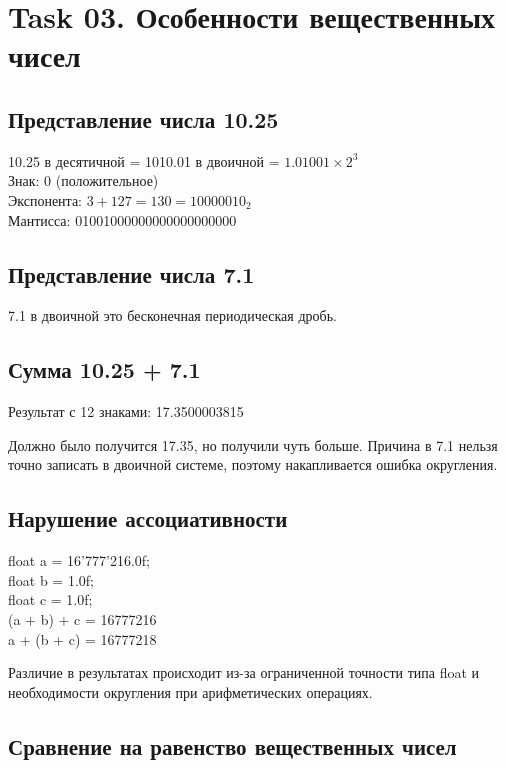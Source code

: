 \documentclass[12pt,a4paper]{article}
\begin{document}
    \section*{Task 03. Особенности вещественных чисел}

    \subsection*{Представление числа 10.25}

    10.25 в десятичной = 1010.01 в двоичной = $1.01001 \times 2^3$\\
    Знак: 0 (положительное)\\
    Экспонента: $3 + 127 = 130 = 10000010_2$\\
    Мантисса: 01001000000000000000000\\

    \subsection*{Представление числа 7.1}

    7.1 в двоичной это бесконечная периодическая дробь.

    \subsection*{Сумма 10.25 + 7.1}

    Результат с 12 знаками: 17.3500003815

    Должно было получится 17.35, но получили чуть больше. Причина в 7.1 нельзя точно записать в двоичной системе, поэтому накапливается ошибка округления.

    \subsection*{Нарушение ассоциативности}

    float a = 16'777'216.0f;\\
    float b = 1.0f;\\
    float c = 1.0f;\\
    (a + b) + c = 16777216 \\
    a + (b + c) = 16777218

    Различие в результатах происходит из-за ограниченной точности типа float и необходимости округления при арифметических операциях.

    \subsection*{Сравнение на равенство вещественных чисел}
\end{document}
